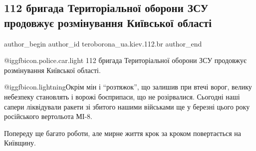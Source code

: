  
 
 
 
 
 
\subsection{112 бригада Територіальної оборони ЗСУ продовжує розмінування Київської області}
\label{sec:27_04_2022.fb.teroborona_ua.kiev.112.br.1.rozminuvannja_kiev_obl}
 
\ifcmt
 author_begin
   author_id teroborona_ua.kiev.112.br
 author_end
\fi

@igg{fbicon.police.car.light}  112 бригада Територіальної оборони ЗСУ
продовжує розмінування Київської області.


@igg{fbicon.lightning}Окрім мін і \enquote{розтяжок}, що залишив при втечі ворог, велику небезпеку
становлять і ворожі боєприпаси, що не розірвалися. Сьогодні наші сапери
ліквідували ракети зі збитого нашими військами ще у березні цього року
російського вертольота МІ-8. 


Попереду ще багато роботи, але мирне життя крок за кроком повертається на
Київщину.
